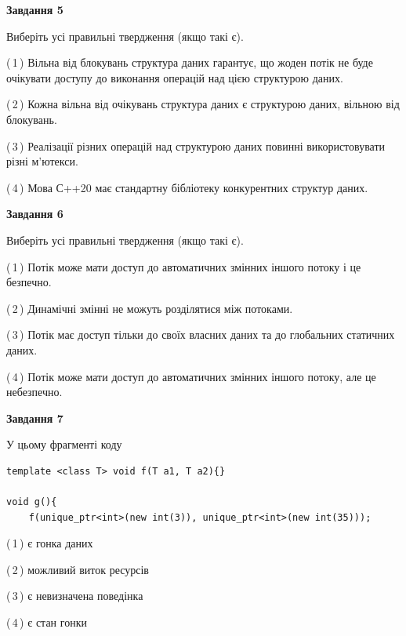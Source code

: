 \documentclass[12pt, ukrainian]{article}
\begin{document}
\begin {large}
{\begin{center}
\textbf{Завдання 5}
\end{center}

Виберіть усі правильні твердження (якщо такі є).\par
\vspace{2mm}

(\,1\,) Вільна від блокувань структура даних гарантує, що жоден потік не буде очікувати доступу до виконання операцій над цією структурою даних.%

(\,2\,) Кожна вільна від очікувань структура даних є структурою даних, вільною від блокувань.%

(\,3\,) Реалізації різних операцій над структурою даних повинні використовувати різні м’ютекси.%

(\,4\,) Мова С++20 має стандартну бібліотеку конкурентних структур даних.%
\newpage


\begin{center}
\textbf{Завдання 6}
\end{center}

Виберіть усі правильні твердження (якщо такі є).\par
\vspace{2mm}

(\,1\,) Потік може мати доступ до автоматичних змінних іншого потоку і це безпечно.%

(\,2\,) Динамічні змінні не можуть розділятися між потоками.%

(\,3\,) Потік має доступ тільки до своїх власних даних та до глобальних статичних даних.%

(\,4\,) Потік може мати доступ до автоматичних змінних іншого потоку, але це небезпечно.%


\begin{center}
\textbf{Завдання 7}
\end{center}

У цьому фрагменті коду
\begin{verbatim}
template <class T> void f(T a1, T a2){}

void g(){
    f(unique_ptr<int>(new int(3)), unique_ptr<int>(new int(35)));
\end{verbatim}

(\,1\,) є гонка даних%

(\,2\,) можливий виток ресурсів%

(\,3\,) є невизначена поведінка%

(\,4\,) є стан гонки%

}
\end {large}

\vspace{4mm}
\newpage
\end{document}
